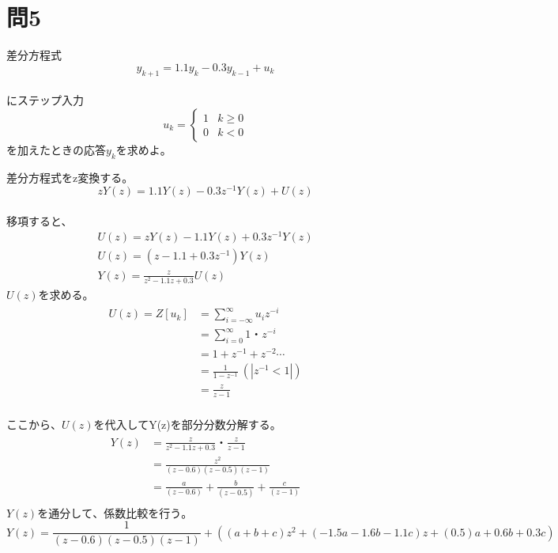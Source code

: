 \documentclass[a4paper,11pt]{ltjsarticle}
\begin{document}
\section*{問5}
差分方程式
\begin{equation*}
  y_{k+1} = 1.1y_{k} - 0.3y_{k-1} + u_{k}
\end{equation*}
\\にステップ入力
\begin{equation*}
  u_{k}=
  \begin{cases*}
    1 & k \geq 0 \\
    0 & k < 0
  \end{cases*}
\end{equation*}
を加えたときの応答$y_{k}$を求めよ。

差分方程式をz変換する。
\begin{equation*}
  zY(z) = 1.1Y(z) - 0.3z^{-1}Y(z) + U(z)
\end{equation*}
\\移項すると、
\begin{gather*}
  U(z) = zY(z) - 1.1Y(z) + 0.3z^{-1}Y(z) \\
  U(z) = (z -1.1 + 0.3z^{-1})Y(z) \\
  Y(z) = \frac{z}{z^{2} -1.1z + 0.3}U(z)
\end{gather*}
$U(z)$を求める。
\begin{gather*}
  \begin{split}
    U(z) = Z[u_{k}]
    &= \sum_{i = -\infty}^{\infty}u_{i}z^{-i} \\
    &= \sum_{i = 0}^{\infty}1 ・ z^{-i} \\
    &= 1 + z^{-1} + z^{-2} \dotsb \\
    &= \frac{1}{1-z^{-1}} \ (|z^{-1} < 1|) \\
    &= \frac{z}{z-1}
  \end{split}
\end{gather*}
\\ここから、$U(z)$を代入してY(z)を部分分数分解する。
\begin{gather*}
  \begin{split}
    Y(z) 
    &= \frac{z}{z^{2}-1.1z+0.3}・\frac{z}{z-1} \\
    &= \frac{z^{2}}{(z-0.6)(z-0.5)(z-1)} \\
    &= \frac{a}{(z-0.6)}+\frac{b}{(z-0.5)}+\frac{c}{(z-1)}\\
  \end{split}
\end{gather*}
$Y(z)を通分して、係数比較を行う。$
\begin{equation*}
  Y(z) = \frac{1}{(z-0.6)(z-0.5)(z-1)}+
  ((a+b+c)z^{2}+(-1.5a-1.6b-1.1c)z+
  (0.5)a+0.6b+0.3c)
\end{equation*}
\end{document}
